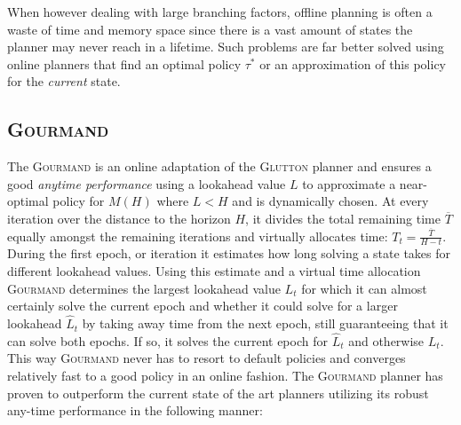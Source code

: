 \documentclass[runningheads,a4paper]{llncs}
\begin{document}

When however dealing with large branching factors, offline planning is often a waste of time and memory space since there is a vast amount of states the planner may never reach in a lifetime. Such problems are far better solved using online planners that find an optimal policy $\tau^*$ or an approximation of this policy for the \emph{current} state.

\subsection{\textsc{Gourmand}}
The \textsc{Gourmand} is an online adaptation of the \textsc{Glutton} planner and ensures a good \emph{anytime performance} using a lookahead value $L$ to approximate a near-optimal policy for $M(H)$ where $L < H$ and is dynamically chosen. At every iteration over the distance to the horizon $H$, it divides the total remaining time $\overline{T}$ equally amongst the remaining iterations and virtually allocates time: $T_t = \frac{\overline{T}}{H - t}$. During the first epoch, or iteration it estimates how long solving a state takes for different lookahead values. Using this estimate and a virtual time allocation \textsc{Gourmand} determines the largest lookahead value $L_t$ for which it can almost certainly solve the current epoch  and whether it could solve for a larger lookahead $\widehat{L}_t$ by taking away time from the next epoch, still guaranteeing that it can solve both epochs. If so, it solves the current epoch for $\widehat{L}_t$ and otherwise $L_t$. This way \textsc{Gourmand} never has to resort to default policies and converges relatively fast to a good policy in an online fashion. The \textsc{Gourmand} planner has proven to outperform the current state of the art planners utilizing its robust any-time performance \cite{kolobov2012gourmand} in the following manner:
\end{document}

